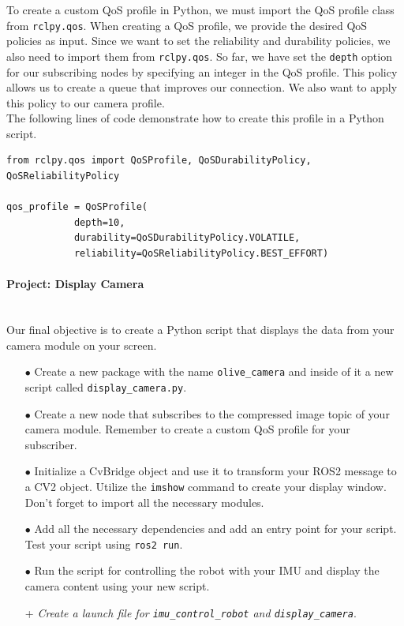 \documentclass{article}
\begin{document}
\noindent
To create a custom QoS profile in Python, we must import the QoS profile class from \texttt{rclpy.qos}. When creating a QoS profile, we provide the desired QoS policies as input. Since we want to set the reliability and durability policies, we also need to import them from \texttt{rclpy.qos}. So far, we have set the \texttt{depth} option for our subscribing nodes by specifying an integer in the QoS profile. This policy allows us to create a queue that improves our connection. We also want to apply this policy to our camera profile.\\

\noindent
The following lines of code demonstrate how to create this profile in a Python script.

\begin{verbatim}
from rclpy.qos import QoSProfile, QoSDurabilityPolicy, QoSReliabilityPolicy

qos_profile = QoSProfile(
            depth=10,
            durability=QoSDurabilityPolicy.VOLATILE,
            reliability=QoSReliabilityPolicy.BEST_EFFORT)
\end{verbatim}

\paragraph{Project: Display Camera}~\\
Our final objective is to create a Python script that displays the data from your camera module on your screen.

\begin{enumerate}
    \item[$\bullet$] Create a new package with the name \texttt{olive\_camera} and inside of it a new script called \texttt{display\_camera.py}.

    \item[$\bullet$] Create a new node that subscribes to the compressed image topic of your camera module. Remember to create a custom QoS profile for your subscriber. 

    \item[$\bullet$] Initialize a CvBridge object and use it to transform your ROS2 message to a CV2 object. Utilize the \texttt{imshow} command to create your display window. Don't forget to import all the necessary modules.

    \item[$\bullet$] Add all the necessary dependencies and add an entry point for your script. Test your script using \texttt{ros2 run}.

    \item[$\bullet$] Run the script for controlling the robot with your IMU and display the camera content using your new script.

    \item[+] \textit{Create a launch file for \texttt{imu\_control\_robot} and \texttt{display\_camera}}.
        
\end{enumerate}
\end{document}
